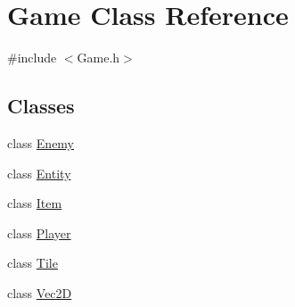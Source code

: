\hypertarget{class_game}{}\section{Game Class Reference}
\label{class_game}


{\ttfamily \#include $<$Game.\+h$>$}

\subsection*{Classes}
\begin{DoxyCompactItemize}
\item 
class \mbox{\hyperlink{class_game_1_1_enemy}{Enemy}}
\item 
class \mbox{\hyperlink{class_game_1_1_entity}{Entity}}
\item 
class \mbox{\hyperlink{class_game_1_1_item}{Item}}
\item 
class \mbox{\hyperlink{class_game_1_1_player}{Player}}
\item 
class \mbox{\hyperlink{class_game_1_1_tile}{Tile}}
\item 
class \mbox{\hyperlink{class_game_1_1_vec2_d}{Vec2D}}
\end{DoxyCompactItemize}
